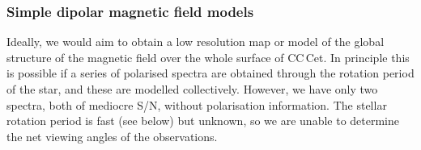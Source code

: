 \documentclass[fleqn,usenatbib]{mnras}
\begin{document}

\subsubsection{Simple dipolar magnetic field models}

Ideally, we would aim to obtain a low resolution map or model of the global structure of the magnetic field over the whole surface of CC\,Cet. In principle this is possible if a series of polarised spectra are obtained through the rotation period of the star, and these are modelled collectively. However, we have only two spectra, both of mediocre S/N, without polarisation information. The stellar rotation period is fast (see below) but unknown, so we are unable to determine the net viewing angles of the observations. 


\end{document}
